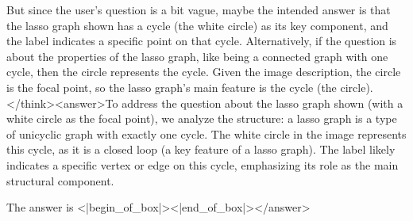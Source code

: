 But since the user's question is a bit vague, maybe the intended answer is that the lasso graph shown has a cycle (the white circle) as its key component, and the label indicates a specific point on that cycle. Alternatively, if the question is about the properties of the lasso graph, like being a connected graph with one cycle, then the circle represents the cycle. Given the image description, the circle is the focal point, so the lasso graph's main feature is the cycle (the circle).</think><answer>To address the question about the lasso graph shown (with a white circle as the focal point), we analyze the structure: a lasso graph is a type of unicyclic graph with exactly one cycle. The white circle in the image represents this cycle, as it is a closed loop (a key feature of a lasso graph). The label likely indicates a specific vertex or edge on this cycle, emphasizing its role as the main structural component.  

The answer is <|begin_of_box|><|end_of_box|></answer>